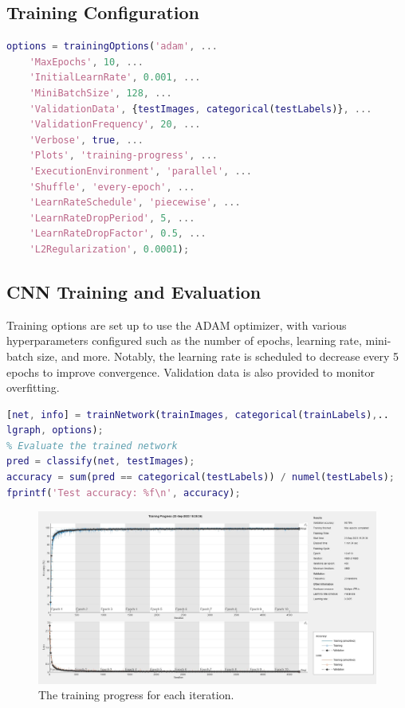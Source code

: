 \subsection{Training Configuration}

\begin{lstlisting}[language=Matlab]
options = trainingOptions('adam', ...
    'MaxEpochs', 10, ...
    'InitialLearnRate', 0.001, ...
    'MiniBatchSize', 128, ...
    'ValidationData', {testImages, categorical(testLabels)}, ...
    'ValidationFrequency', 20, ...
    'Verbose', true, ...
    'Plots', 'training-progress', ...
    'ExecutionEnvironment', 'parallel', ...
    'Shuffle', 'every-epoch', ...
    'LearnRateSchedule', 'piecewise', ...
    'LearnRateDropPeriod', 5, ...
    'LearnRateDropFactor', 0.5, ...
    'L2Regularization', 0.0001);
\end{lstlisting}

\subsection{CNN Training and Evaluation}
Training options are set up to use the ADAM optimizer, with various hyperparameters configured such as the number of epochs, learning rate, mini-batch size, and more. Notably, the learning rate is scheduled to decrease every 5 epochs to improve convergence. Validation data is also provided to monitor overfitting.


\begin{lstlisting}[language=Matlab]
%% Train the CNN
[net, info] = trainNetwork(trainImages, categorical(trainLabels),..
lgraph, options);
% Evaluate the trained network
pred = classify(net, testImages);
accuracy = sum(pred == categorical(testLabels)) / numel(testLabels);
fprintf('Test accuracy: %f\n', accuracy);
\end{lstlisting}
\begin{figure}[h]
    \centering
    \includegraphics[width=1\textwidth]{cnn_training.jpg}
    \caption{The training progress for each iteration.}
    \label{fig:the training progress} 
\end{figure}


